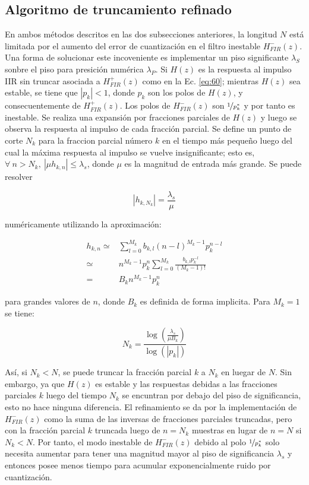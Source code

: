 \subsection{Algoritmo de truncamiento refinado}
  En ambos métodos descritos en las dos subsecciones anteriores, la longitud $N$ está limitada por el aumento del error de cuantización en el filtro inestable $H_{FIR}^{-}(z)$. Una forma de solucionar este incoveniente es implementar un piso significante $\lambda_S$ sonbre el piso para presición numérica $\lambda_P$. Si $H(z)$ es la respuesta al impulso IIR sin truncar asociada a $H_{FIR}^{ +}(z)$ como en la Ec. \ref{eq:60}; mientras $H(z)$ sea estable, se tiene que $|p_k|<1$, donde $p_k$ son los polos de $H(z)$, y consecuentemente de $H_{FIR}^{ +}(z)$. Los polos de $H_{FIR}^{-}(z)$ son $\nicefrac{1}{p_k^{*}}$ y por tanto es inestable. Se realiza una expansión por fracciones parciales de $H(z)$ y luego se observa la respuesta al impulso de cada fracción parcial. Se define un punto de corte $N_k$ para la fraccion parcial número $k$ en el tiempo más pequeño luego del cual la máxima respuesta al impulso se vuelve insignificante; esto es, $\forall \: n > N_k, \: |\mu h_{k,n}| \leq \lambda_s$, donde $\mu$ es la magnitud de entrada más grande. Se puede resolver

  \begin{equation}
    |h_{k,N_k}| = \frac{\lambda_s}{\mu}
  \end{equation}

  numéricamente utilizando la aproximación:

  \begin{align}
    h_{k,n} \simeq & \sum_{l=0}^{M_k}{b_{k,l}(n-l)^{M_k-1} p_k^{n-l}}\\
    \simeq & n^{M_k-1} p_k^{n} \sum_{l=0}^{M_k}{\frac{b_{k,l}p_k^{-l}}{(M_k-1)!}}\\
    = & B_k n^{M_k-1} p_k^{n}
  \end{align}

  para grandes valores de $n$, donde $B_k$ es definida de forma implicita. Para $M_k=1$ se tiene:

  \begin{equation}
    N_k = \frac{\log \left( \frac{\lambda_s}{\mu B_k}\right)}{\log (|p_k|)}
    \label{eq:73}
  \end{equation}

  Así, si $N_k < N$, se puede truncar la fracción parcial $k$ a $N_k$ en luegar de $N$. Sin embargo, ya que $H(z)$ es estable y las respuestas debidas a las fracciones parciales $k$ luego del tiempo $N_k$ se encuntran por debajo del piso de significancia, esto no hace ninguna diferencia. El refinamiento se da por la implementación de $H_{FIR}^{ -}(z)$  como la suma de las inversas de fracciones parciales truncadas, pero con la fracción parcial $k$ truncada luego de $n=N_k$ muestras en lugar de $n=N$ si $N_k < N$. Por tanto, el modo inestable de $H_{FIR}^{ -}(z)$ debido al polo $\nicefrac{1}{p_k^{*}}$ solo necesita aumentar para tener una magnitud mayor al piso de significancia $\lambda_s$ y entonces posee menos tiempo para acumular exponencialmente ruido por cuantización.

